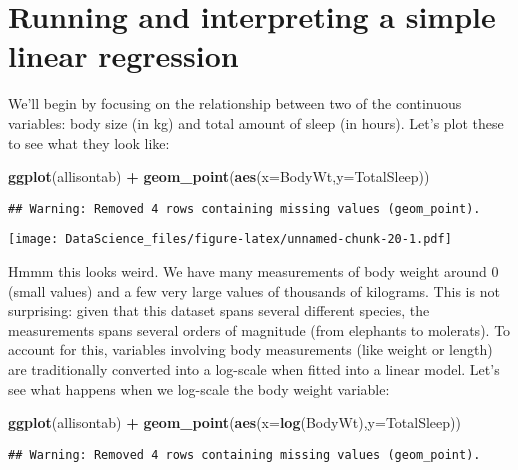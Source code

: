 \documentclass[
]{book}
\newenvironment{Shaded}{\begin{snugshade}}{\end{snugshade}}
\newcommand{\DataTypeTok}[1]{\textcolor[rgb]{0.13,0.29,0.53}{#1}}
\newcommand{\KeywordTok}[1]{\textcolor[rgb]{0.13,0.29,0.53}{\textbf{#1}}}
\newcommand{\NormalTok}[1]{#1}
\newcommand{\OperatorTok}[1]{\textcolor[rgb]{0.81,0.36,0.00}{\textbf{#1}}}
\newcommand{\StringTok}[1]{\textcolor[rgb]{0.31,0.60,0.02}{#1}}
\begin{document}
\hypertarget{running-and-interpreting-a-simple-linear-regression}{%
\section{Running and interpreting a simple linear regression}\label{running-and-interpreting-a-simple-linear-regression}}

We'll begin by focusing on the relationship between two of the continuous variables: body size (in kg) and total amount of sleep (in hours). Let's plot these to see what they look like:

\begin{Shaded}
\begin{Highlighting}[]
\KeywordTok{ggplot}\NormalTok{(allisontab) }\OperatorTok{+}\StringTok{ }\KeywordTok{geom\_point}\NormalTok{(}\KeywordTok{aes}\NormalTok{(}\DataTypeTok{x=}\NormalTok{BodyWt,}\DataTypeTok{y=}\NormalTok{TotalSleep))}
\end{Highlighting}
\end{Shaded}

\begin{verbatim}
## Warning: Removed 4 rows containing missing values (geom_point).
\end{verbatim}

\texttt{[image: DataScience\_files/figure-latex/unnamed-chunk-20-1.pdf]}

Hmmm this looks weird. We have many measurements of body weight around 0 (small values) and a few very large values of thousands of kilograms. This is not surprising: given that this dataset spans several different species, the measurements spans several orders of magnitude (from elephants to molerats). To account for this, variables involving body measurements (like weight or length) are traditionally converted into a log-scale when fitted into a linear model. Let's see what happens when we log-scale the body weight variable:

\begin{Shaded}
\begin{Highlighting}[]
\KeywordTok{ggplot}\NormalTok{(allisontab) }\OperatorTok{+}\StringTok{ }\KeywordTok{geom\_point}\NormalTok{(}\KeywordTok{aes}\NormalTok{(}\DataTypeTok{x=}\KeywordTok{log}\NormalTok{(BodyWt),}\DataTypeTok{y=}\NormalTok{TotalSleep))}
\end{Highlighting}
\end{Shaded}

\begin{verbatim}
## Warning: Removed 4 rows containing missing values (geom_point).
\end{verbatim}
\end{document}
